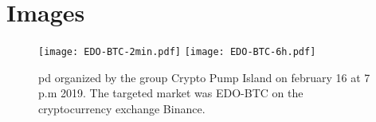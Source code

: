 \section{Images}



\begin{figure}
    \centering
    \texttt{[image: EDO-BTC-2min.pdf]}
    \texttt{[image: EDO-BTC-6h.pdf]}
    \caption{\ac{pd} organized by the group Crypto Pump Island on february 16 at 7 p.m 2019. The targeted market was EDO-BTC on the cryptocurrency exchange Binance.}
    \label{fig:EDO-BTC}
\end{figure}